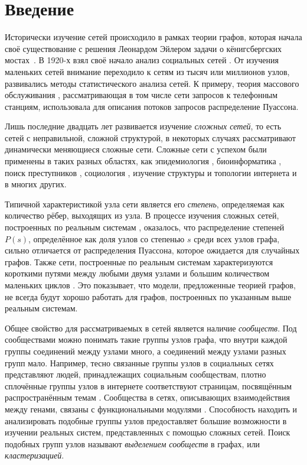 \section*{Введение}

Исторически изучение сетей происходило в рамках теории графов, которая начала своё существование с решения Леонардом Эйлером задачи о кёнигсбергских мостах~\cite{Euler:1741}. В 1920-х взял своё начало анализ социальных сетей \cite{Weber:1978}. От изучения маленьких сетей внимание переходило к сетям из тысяч или миллионов узлов, развивались методы статистического анализа сетей. К примеру, теория массового обслуживания \cite{Erlang:1917}, рассматривающая в том числе сети запросов к телефонным станциям, использовала для описания потоков запросов распределение Пуассона.

Лишь последние двадцать лет развивается изучение \emph{сложных сетей}, то есть сетей с неправильной, сложной структурой, в некоторых случаях рассматривают динамически меняющиеся сложные сети. Сложные сети с успехом были применены в таких разных областях, как эпидемиология \cite{Moore&Newman:2000}, биоинформатика \cite{Zhao&al:2006}, поиск преступников \cite{Hong&al:2009}, социология \cite{Scott:2012}, изучение структуры и топологии интернета \cite{Faloutsos&al:1999, Broder&al:2000} и в многих других.

Типичной характеристикой узла сети является его \emph{степень}, определяемая как количество рёбер, выходящих из узла. В процессе изучения сложных сетей, построенных по реальным системам \cite{Moore&Newman:2000, Zhao&al:2006, Hong&al:2009, Scott:2012, Faloutsos&al:1999, Broder&al:2000}, оказалось, что распределение степеней $P(s)$, определённое как доля узлов со степенью $s$ среди всех узлов графа, сильно отличается от распределения Пуассона, которое ожидается для случайных графов. Также сети, построенные по реальным системам характеризуются короткими путями между любыми двумя узлами и большим количеством маленьких циклов \cite{Boccaletti&al:2006}. Это показывает, что модели, предложенные теорией графов, не всегда будут хорошо работать для графов, построенных по указанным выше реальным системам.

Общее свойство для рассматриваемых в \cite{Moore&Newman:2000, Zhao&al:2006, Hong&al:2009, Scott:2012, Faloutsos&al:1999, Broder&al:2000} сетей является наличие \emph{сообществ}. Под сообществами можно понимать такие группы узлов графа, что внутри каждой группы соединений между узлами  много, а соединений между узлами разных групп мало. Например, тесно связанные группы узлов в социальных сетях представляют людей, принадлежащих социальным сообществам, плотно сплочённые группы узлов в интернете соответствуют страницам, посвящённым распространённым темам \cite{Boccaletti&al:2006}. Сообщества в сетях, описывающих взаимодействия между генами, связаны с функциональными модулями \cite{Dejori&al:2004}. Способность находить и анализировать подобные группы узлов предоставляет большие возможности в изучении реальных систем, представленных с помощью сложных сетей. Поиск подобных групп узлов называют \emph{выделением сообществ} в графах, или \emph{кластеризацией}.

